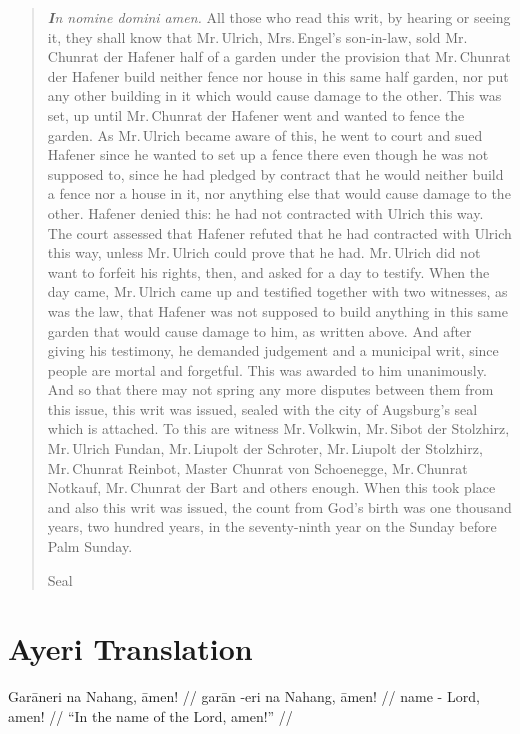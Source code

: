 \documentclass[12pt,paper=a4]{scrartcl}
\begin{document}
\blockquote{\emph{\textbf{I}n nomine domini amen.} All those who read this writ, 
by hearing or seeing it, they shall know that Mr.\,Ulrich, Mrs.\,Engel's 
son-in-law, sold Mr.\,Chunrat der Hafener half of a garden under the provision 
that Mr.\,Chunrat der Hafener build neither fence nor house in this same half 
garden, nor put any other building in it which would cause damage to the other. 
This was set, up until Mr.\,Chunrat der Hafener went and wanted to fence the 
garden. As Mr.\,Ulrich became aware of this, he went to court and sued Hafener 
since he wanted to set up a fence there even though he was not supposed to, 
since he had pledged by contract that he would neither build a fence nor a house 
in it, nor anything else that would cause damage to the other. Hafener denied 
this: he had not contracted with Ulrich this way. The court assessed that 
Hafener refuted that he had contracted with Ulrich this way, unless Mr.\,Ulrich 
could prove that he had. Mr.\,Ulrich did not want to forfeit his rights, then, 
and asked for a day to testify. When the day came, Mr.\,Ulrich came up and 
testified together with two witnesses, as was the law, that Hafener was not 
supposed to build anything in this same garden that would cause damage to him, 
as written above. And after giving his testimony, he demanded judgement and a 
municipal writ, since people are mortal and forgetful. This was awarded to him 
unanimously. And so that there may not spring any more disputes between them 
from this issue, this writ was issued, sealed with the city of Augsburg's seal 
which is attached. To this are witness Mr.\,Volkwin, Mr.\,Sibot der Stolzhirz, 
Mr.\,Ulrich Fundan, Mr.\,Liupolt der Schroter, Mr.\,Liupolt der Stolzhirz, 
Mr.\,Chunrat Reinbot, Master Chunrat von Schoenegge, Mr.\,Chunrat Notkauf, 
Mr.\,Chunrat der Bart and others enough. When this took place and also this 
writ was issued, the count from God's birth was one thousand years, two hundred 
years, in the seventy-ninth year on the Sunday before Palm Sunday.

\begin{center}
Seal
\end{center}}

\section{Ayeri Translation}


\ex \begingl
	\glpreamble Garāneri na Nahang, āmen! //
	\gla garān -eri na Nahang, āmen! //
	\glb name -\Ins{} \Gen{} Lord, amen! //
	\glft \enquote{In the name of the Lord, amen!} //
\endgl \xe
\end{document}
